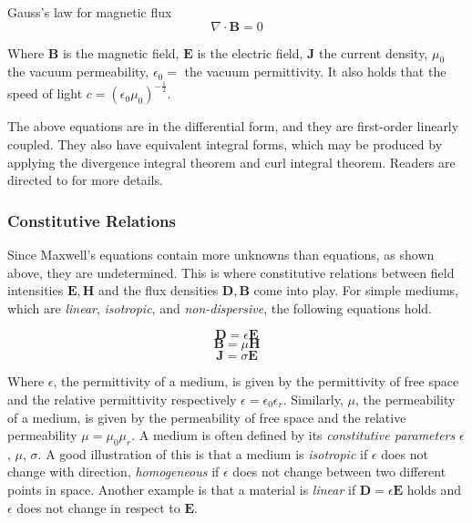 Gauss's law for magnetic flux
\begin{equation}
\nabla \cdot \mathbf{B} = 0
\end{equation}



Where $\mathbf{B}$ is the magnetic field, $\mathbf{E}$ is the electric field, $\mathbf{J}$ the current density, $\mu_0$ the vacuum permeability, $\epsilon_0 = $ the vacuum permittivity. It also holds that the speed of light $c=\left(\epsilon_0\mu_0\right)^{-\frac{1}{2}}$.

The above equations are in the differential form, and they are first-order linearly coupled. They also have equivalent integral forms, which may be produced by applying the divergence integral theorem and curl integral theorem. Readers are directed to \cite[Chapter~2.4]{staelin2009electromagnetics} for more details. 




\subsubsection*{Constitutive Relations}
Since Maxwell's equations contain more unknowns than equations, as shown above, they are undetermined. This is where constitutive relations between field intensities $\mathbf{E},\mathbf{H}$ and the flux densities $\mathbf{D},\mathbf{B}$ come into play. 
For simple mediums, which are \textit{linear}, \textit{isotropic}, and \textit{non-dispersive}, the following equations hold.


\begin{equation}
\mathbf{D} = \epsilon \mathbf{E}
\end{equation}
\begin{equation}
\mathbf{B} = \mu \mathbf{H}
\end{equation}
\begin{equation}
\mathbf{J} = \sigma \mathbf{E}
\end{equation}

Where $\epsilon$, the permittivity of a medium, is given by the permittivity of free space and the relative permittivity respectively $\epsilon = \epsilon_0\epsilon_r$. Similarly, $\mu$, the permeability of a medium, is given by the permeability of free space and the relative permeability $\mu = \mu_0\mu_r$. A medium is often defined by its \textit{constitutive parameters} $\epsilon$, $\mu$, $\sigma$. A good illustration of this is that a medium is \textit{isotropic} if $\epsilon$ does not change with direction, \textit{homogeneous} if $\epsilon$ does not change between two different points in space. Another example is that a material is \textit{linear} if $\mathbf{D} = \epsilon \mathbf{E}$ holds and $\epsilon$ does not change in respect to $\mathbf{E}$.





